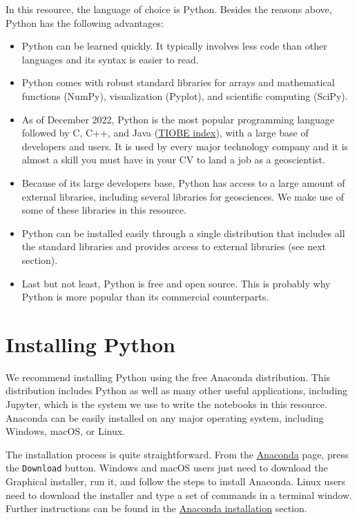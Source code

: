 \documentclass[a4paper , 12pt]{book}
\newcommand{\code}[1]{\colorbox{light-gray}{\texttt{#1}}}
\begin{document}
In this resource, the language of choice is Python. Besides the reasons above, Python has the following advantages:
\begin{itemize}
  \item Python can be learned quickly. It typically involves less code than other languages and its syntax is easier to read.
  \item Python comes with robust standard libraries for arrays and mathematical functions (NumPy), visualization (Pyplot), and scientific computing (SciPy).
  \item As of December 2022, Python is the most popular programming language followed by C, C++, and Java (\href {https://tiobe.com/tiobe-index/}{TIOBE index}), with a large base of developers and users. It is used by every major technology company and it is almost a skill you must have in your CV to land a job as a geoscientist.
  \item Because of its large developers base, Python has access to a large amount of external libraries, including several libraries for geosciences. We make use of some of these libraries in this resource.
  \item Python can be installed easily through a single distribution that includes all the standard libraries and provides access to external libraries (see next section).
  \item Last but not least, Python is free and open source. This is probably why Python is more popular than its commercial counterparts.
\end{itemize}

\section{Installing Python}

We recommend installing Python using the free Anaconda distribution. This distribution includes Python as well as many other useful applications, including Jupyter, which is the system we use to write the notebooks in this resource. Anaconda can be easily installed on any major operating system, including Windows, macOS, or Linux.

The installation process is quite straightforward. From the \href {https://www.anaconda.com}{Anaconda} page, press the \code{Download} button. Windows and macOS users just need to download the Graphical installer, run it, and follow the steps to install Anaconda. Linux users need to download the installer and type a set of commands in a terminal window. Further instructions can be found in the \href {https://docs.anaconda.com/anaconda/install/} {Anaconda installation} section.
\end{document}
